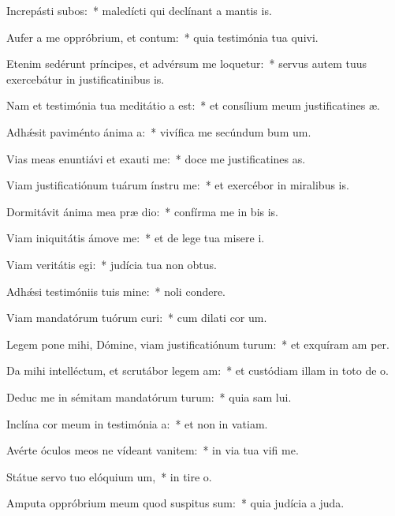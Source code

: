 \item Increpásti subos:~* maledícti qui declínant a mantis is.
\item Aufer a me oppróbrium, et contum:~* quia testimónia tua quivi.
\item Etenim sedérunt príncipes, et advérsum me loquetur:~* servus autem tuus exercebátur in justificatinibus is.
\item Nam et testimónia tua meditátio a est:~* et consílium meum justificatines æ.
\item Adhǽsit paviménto ánima a:~* vivífica me secúndum bum um.
\item Vias meas enuntiávi et exauti me:~* doce me justificatines as.
\item Viam justificatiónum tuárum ínstru me:~* et exercébor in miralibus is.
\item Dormitávit ánima mea præ dio:~* confírma me in bis is.
\item Viam iniquitátis ámove  me:~* et de lege tua misere i.
\item Viam veritátis egi:~* judícia tua non  obtus.
\item Adhǽsi testimóniis tuis mine:~* noli  condere.
\item Viam mandatórum tuórum curi:~* cum dilati cor um.
\item Legem pone mihi, Dómine, viam justificatiónum turum:~* et exquíram am per.
\item Da mihi intelléctum, et scrutábor legem am:~* et custódiam illam in toto de o.
\item Deduc me in sémitam mandatórum turum:~* quia sam lui.
\item Inclína cor meum in testimónia a:~* et non in vatiam.
\item Avérte óculos meos ne vídeant vanitem:~* in via tua vifi me.
\item Státue servo tuo elóquium um,~* in tire o.
\item Amputa oppróbrium meum quod suspitus sum:~* quia judícia a juda.
